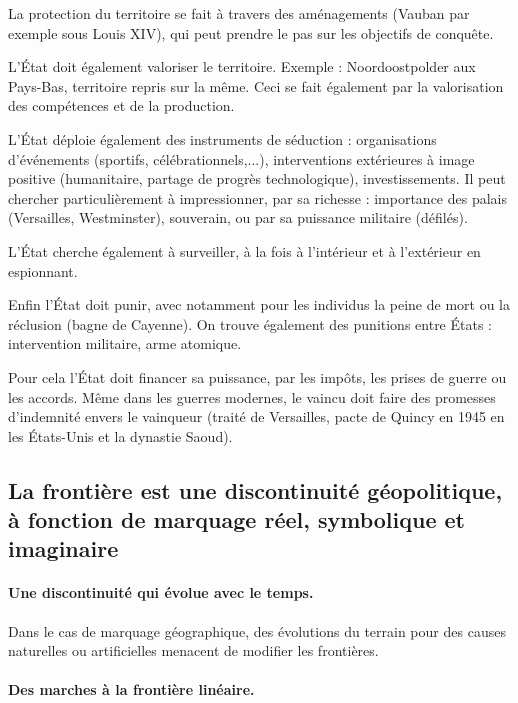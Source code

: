 \documentclass[a4paper,10pt]{article}
\begin{document}
		La protection du territoire se fait à travers des aménagements (Vauban par exemple sous Louis XIV), qui peut prendre le pas sur les objectifs de conquête.

		L'État doit également valoriser le territoire.
		Exemple : Noordoostpolder aux Pays-Bas, territoire repris sur la même.
		Ceci se fait également par la valorisation des compétences et de la production.

		L'État déploie également des instruments de séduction : organisations d'événements (sportifs, célébrationnels,...), interventions extérieures à image positive (humanitaire, partage de progrès technologique), investissements.
		Il peut chercher particulièrement à impressionner, par sa richesse : importance des palais (Versailles, Westminster), souverain, ou par sa puissance militaire (défilés).

		L'État cherche également à surveiller, à la fois à l'intérieur et à l'extérieur en espionnant.

		Enfin l'État doit punir, avec notamment pour les individus la peine de mort ou la réclusion (bagne de Cayenne).
		On trouve également des punitions entre États : intervention militaire, arme atomique.

		Pour cela l'État doit financer sa puissance, par les impôts, les prises de guerre ou les accords.
		Même dans les guerres modernes, le vaincu doit faire des promesses d'indemnité envers le vainqueur (traité de Versailles, pacte de Quincy en 1945 en les États-Unis et la dynastie Saoud).

	\subsection{La frontière est une discontinuité géopolitique, à fonction de marquage réel, symbolique et imaginaire}

		\paragraph{Une discontinuité qui évolue avec le temps.}

		Dans le cas de marquage géographique, des évolutions du terrain pour des causes naturelles ou artificielles menacent de modifier les frontières.

		\paragraph{Des marches à la frontière linéaire.}
\end{document}
